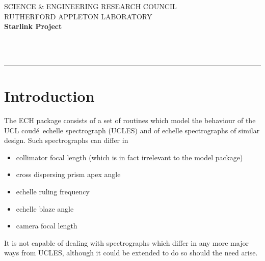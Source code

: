 
\newcommand{\coude}{coud\'{e}}


\thispagestyle{empty}
SCIENCE \& ENGINEERING RESEARCH COUNCIL \hfill \stardocname\\
RUTHERFORD APPLETON LABORATORY\\
{\large\bf Starlink Project\\}
{\large\bf \stardoccategory\ \stardocnumber}
\begin{flushright}
\stardocauthors\\
\stardocdate
\end{flushright}
\vspace{-4mm}
\rule{\textwidth}{0.5mm}
\vspace{5mm}
\begin{center}
{\Large\bf \stardoctitle}
\end{center}
\vspace{5mm}

\setlength{\parskip}{0mm}
\tableofcontents
\setlength{\parskip}{\medskipamount}
\markright{\stardocname}

\section{Introduction}

The ECH package consists of a set of routines which model the behaviour of the
UCL \coude\ echelle spectrograph (UCLES) and of echelle spectrographs of
similar design. Such spectrographs can differ in
\begin{itemize}
\item collimator focal length (which is in fact irrelevant to the model package)
\item cross dispersing prism apex angle
\item echelle ruling frequency
\item echelle blaze angle
\item camera focal length
\end{itemize}

It is not capable of dealing with spectrographs which differ in any more major
ways from UCLES, although it could be extended to do so should the need arise.

